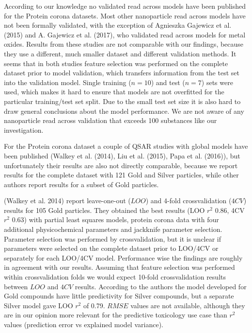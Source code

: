 \documentclass[utf8]{frontiersHLTH} %
\begin{document}
According to our knowledge no validated read across models have been
published for the Protein corona datasets. Most other nanoparticle read
across models have not been formally validated, with the exception of
Agnieszka Gajewicz et al. (2015) and A. Gajewicz et al. (2017), who
validated read across models for metal oxides. Results from these
studies are not comparable with our findings, because they use a
different, much smaller dataset and different validation methods. It
seems that in both studies feature selection was performed on the
complete dataset prior to model validation, which transfers information
from the test set into the validation model. Single training (\(n=10\))
and test (\(n=7\)) sets were used, which makes it hard to ensure that
models are not overfitted for the particular training/test set split.
Due to the small test set size it is also hard to draw general
conclusions about the model performance. We are not aware of any
nanoparticle read across validation that exceeds 100 substances like our
investigation.

For the Protein corona dataset a couple of QSAR studies with global
models have been published (Walkey et al. (2014), Liu et al. (2015),
Papa et al. (2016)), but unfortunately their results are also not
directly comparable, because we report results for the complete dataset
with 121 Gold and Silver particles, while other authors report results
for a subset of Gold particles.

(Walkey et al. 2014) report leave-one-out (\(LOO\)) and 4-fold
crossvalidation (\(4CV\)) results for 105 Gold particles. They obtained
the best results (LOO \(r^2\) 0.86, 4CV \(r^2\) 0.63) with partial least
squares models, protein corona data with four additional physicochemical
parameters and jackknife parameter selection. Parameter selection was
performed by crossvalidation, but it is unclear if parameters were
selected on the complete dataset prior to LOO/4CV or separately for each
LOO/4CV model. Performance wise the findings are roughly in agreement
with our results. Assuming that feature selection was performed within
crossvalidation folds we would expect 10-fold crossvalidation results
between \(LOO\) and \(4CV\) results. According to the authors the model
developed for Gold compounds have little predictivity for Silver
compounds, but a separate Silver model gave LOO \(r^2\) of 0.79.
\(RMSE\) values are not available, although they are in our opinion more
relevant for the predictive toxicology use case than \(r^2\) values
(prediction error vs explained model variance).
\end{document}

